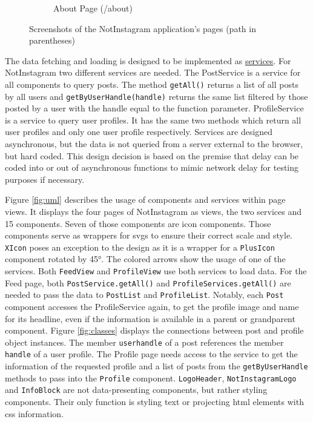 \documentclass[a4paper, 12pt]{article}
\begin{document}
\begin{figure}[ht!]
\begin{subfigure}{0.49\linewidth}
\begin{center}
    \end{center}
    \caption{About Page (/about)}\label{subfig:about}
  \end{subfigure}
  \caption{Screenshots of the NotInstagram application's pages (path in parentheses)}\label{fig:screenshots}
\end{figure}

The data fetching and loading is designed to be implemented as \hyperref[enum:services]{services}.
For NotInstagram two different services are needed.
The PostService is a service for all components to query posts.
The method \verb|getAll()| returns a list of all posts by all users and \verb|getByUserHandle(handle)| returns the same list filtered by those posted by a user with the handle equal to the function parameter.
ProfileService is a service to query user profiles.
It has the same two methods which return all user profiles and only one user profile respectively.
Services are designed asynchronous, but the data is not queried from a server external to the browser, but hard coded.
This design decision is based on the premise that delay can be coded into or out of asynchronous functions to mimic network delay for testing purposes if necessary.

Figure \ref{fig:uml} describes the usage of components and services within page views.
It displays the four pages of NotInstagram as views, the two services and 15 components.
Seven of those components are icon components.
Those components serve as wrappers for \acrshort{svg}s to ensure their correct scale and style.
\verb|XIcon| poses an exception to the design as it is a wrapper for a \verb|PlusIcon| component rotated by 45°.
The colored arrows show the usage of one of the services.
Both \verb|FeedView| and \verb|ProfileView| use both services to load data.
For the Feed page, both \verb|PostService.getAll()| and \verb|ProfileServices.getAll()| are needed to pass the data to \verb|PostList| and \verb|ProfileList|.
Notably, each \verb|Post| component accesses the ProfileService again, to get the profile image and name for its headline, even if the information is available in a parent or grandparent component.
Figure \ref{fig:classes} displays the connections between post and profile object instances.
The member \verb|userhandle| of a post references the member \verb|handle| of a user profile.
The Profile page needs access to the service to get the information of the requested profile and a list of posts from the \verb|getByUserHandle| methods to pass into the \verb|Profile| component.
\verb|LogoHeader|, \verb|NotInstagramLogo| and \verb|InfoBlock| are not data-presenting components, but rather styling components.
Their only function is styling text or projecting \acrshort{html} elements with \acrshort{css} information.
\end{document}
